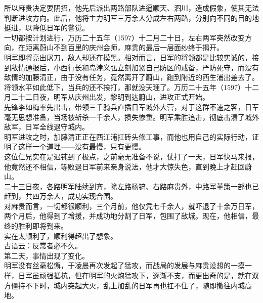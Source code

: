 \begin{multicols}{\theparacolNo}
所以麻贵决定耍阴招，他先后派出两路部队进逼顺天、泗川，造成假象，使其无法判断进攻方向。此后，他将主力明军三万余人分成左右两路，分别向不同的目的地挺进，以降低日军的警觉。\\

一切都按计划进行，万历二十五年（1597）十二月二十日，左右两军突然改变方向，在距离蔚山不到百里的庆州会师，麻贵的最后一层面纱终于揭开。\\

明军即将亮出屠刀，敌人却还在摸黑。相对而言，日军的将领都是比较实诚的，接到敌情通报后，小西行长和岛津义弘立刻加紧自己防区的戒备，严防死守，而没有敌情的加藤清正，由于没有任务，竟然离开了蔚山，跑到附近的西生浦出差去了。\\

将领水平如此低下，当兵的还不挨打，那就没天理了。万历二十五年（1597）十二月二十二日夜，明军从庆州出发，黎明到达蔚山，进攻正式开始。\\

先锋李如梅率先出击，带领三千骑兵直插日军城外大营，对于这群不速之客，日军毫无思想准备，当场被斩杀一千余人，损失惨重。明军乘胜追击，彻底击溃了城外敌军，日军全线退守城内。\\

明军进攻之时，加藤清正正在西江浦扛砖头修工事，而他也用自己的实际行动，证明了这样一个道理——没有最慢，只有更慢。\\

这位仁兄实在是迟钝到了极点，之前毫无准备不说，仗打了一天，日军快马来报，他竟然还不相信，等败退日军前来亲身说法，他才大惊失色，直到晚上才赶回蔚山。\\

二十三日夜，各路明军陆续到齐，除左路杨镐、右路麻贵外，中路军董策一部也已赶到，共四万余人，成功实现合围。\\

对麻贵而言，一切都很顺利，三个月前，他仅凭七千余人，就吓退了十余万日军，两个月后，他得到了增援，并成功地分割了日军，包围了敌城。现在，他相信，最终的胜利即将到来。\\

实在太顺利了，顺利得超出了想象。\\

古语云：反常者必不久。\\

第二天，事情出现了变化。\\

明军没有丝毫松懈，于凌晨再次发起了猛攻，而战局的发展与麻贵设想的一摸一样，日军虽顽强抵抗，但在明军的火炮猛攻下，逐渐不支，而更出奇的是，就在双方僵持不下时，城内突起大火，乱上加乱的日军再也扛不住了，随即撤往内城高地。\\


\end{multicols}
